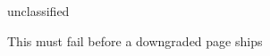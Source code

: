 \documentclass[aspectratio=169,professionalfonts]{beamer}
\title{\LSTitle}
\author{\LSAuthor}
\date{\LSDate}
\begin{document}
\begin{frame}\titlepage\end{frame}
\begin{LSSlideMarking}{unclassified}
  \begin{frame}[allowframebreaks]{This must fail before a downgraded page ships}
    \framebreak
  \end{frame}
\end{LSSlideMarking}
\end{document}
